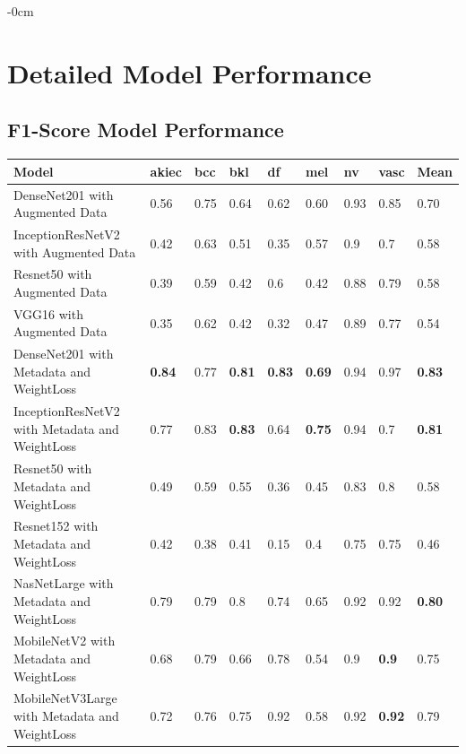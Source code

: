 \documentclass[sensors,article,submit,pdftex,moreauthors]{Definitions/mdpi}
\begin{document}
\begin{adjustwidth}{-\extralength}{0cm}
	
\section[\appendixname~\thesection]{Detailed Model Performance}
\subsection[\appendixname~\thesection]{F1-Score Model Performance}
\begin{table}[H]
	\centering
	\begin{tabular}{|p{5cm} | p{0.6cm} | p{0.6cm} | p{0.6cm} | p{0.6cm} | p{0.6cm} | p{0.6cm} | p{0.6cm} | p{0.7cm}|} 
		\hline
		Model & akiec & bcc & bkl & df & mel & nv & vasc & Mean \\
		\hline
		DenseNet201 with Augmented Data & 0.56 & 0.75 & 0.64 & 0.62 & 0.60 & 0.93 & 0.85 & 0.70 \\ 
		\hline
		InceptionResNetV2 with Augmented Data & 0.42 &	0.63 & 0.51 & 0.35 & 0.57 & 0.9 & 0.7 & 0.58\\
		\hline
		Resnet50 with Augmented Data & 0.39 & 0.59 & 0.42 & 0.6 & 0.42 & 0.88 & 0.79 & 0.58\\
		\hline 	
		VGG16 with Augmented Data & 0.35 & 0.62 & 0.42 & 0.32 & 0.47 & 0.89 & 0.77 & 0.54\\ 
		\hline		
		DenseNet201 with Metadata and WeightLoss & \textbf{0.84} & 0.77 & \textbf{0.81} & \textbf{0.83} & \textbf{0.69} & 0.94 & 0.97 & \textbf{0.83}\\
		\hline
		InceptionResNetV2 with Metadata and WeightLoss & 0.77 & 0.83 & \textbf{0.83} & 0.64 & \textbf{0.75} & 0.94 & 0.7 & \textbf{0.81}\\
		\hline
		Resnet50 with Metadata and WeightLoss & 0.49 & 0.59 & 0.55 & 0.36 & 0.45 & 0.83 & 0.8 & 0.58\\
		\hline
		Resnet152 with Metadata and WeightLoss & 0.42 & 0.38 & 0.41 & 0.15 & 0.4 & 0.75 & 0.75 & 0.46\\
		\hline
		NasNetLarge with Metadata and WeightLoss & 0.79 & 0.79 & 0.8 & 0.74 & 0.65 & 0.92 & 0.92 & \textbf{0.80}\\
		\hline
		MobileNetV2 with Metadata and WeightLoss & 0.68 & 0.79 & 0.66 & 0.78 & 0.54 & 0.9 & \textbf{0.9} & 0.75\\
		\hline
		MobileNetV3Large with Metadata and WeightLoss & 0.72 & 0.76 & 0.75 & 0.92 & 0.58 & 0.92 & \textbf{0.92} & 0.79\\

\end{tabular}
\end{table}
\end{adjustwidth}
\end{document}
